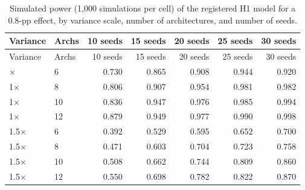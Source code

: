 {\footnotesize
\setlength{\tabcolsep}{3.5pt}
\begin{longtable}{llrrrrr}
\caption{Simulated power (1,000 simulations per cell) of the registered H1 model for a 0.8-pp effect, by variance scale, number of architectures, and number of seeds.}\label{r:tab:power}\\
\toprule
Variance & Archs & 10 seeds & 15 seeds & 20 seeds & 25 seeds & 30 seeds \\
\midrule
\endfirsthead
\toprule
Variance & Archs & 10 seeds & 15 seeds & 20 seeds & 25 seeds & 30 seeds \\
\midrule
\endhead
\bottomrule
\endfoot
1$\times$ & 6 & 0.730 & 0.865 & 0.908 & 0.944 & 0.920 \\
1$\times$ & 8 & 0.806 & 0.907 & 0.954 & 0.981 & 0.982 \\
1$\times$ & 10 & 0.836 & 0.947 & 0.976 & 0.985 & 0.994 \\
1$\times$ & 12 & 0.879 & 0.949 & 0.977 & 0.990 & 0.998 \\
1.5$\times$ & 6 & 0.392 & 0.529 & 0.595 & 0.652 & 0.700 \\
1.5$\times$ & 8 & 0.471 & 0.603 & 0.704 & 0.723 & 0.758 \\
1.5$\times$ & 10 & 0.508 & 0.662 & 0.744 & 0.809 & 0.860 \\
1.5$\times$ & 12 & 0.550 & 0.698 & 0.782 & 0.822 & 0.870 \\
\end{longtable}
}
